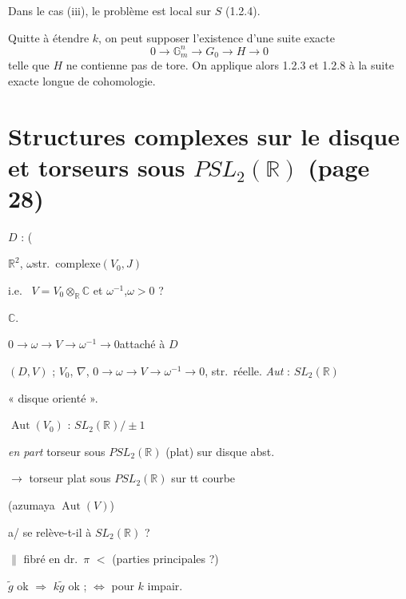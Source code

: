 \documentclass[11pt,a4paper]{article}
\begin{document}
Dans le cas (iii), le problème est local sur $S$ (1.2.4).

Quitte à étendre $k$, on peut supposer l'existence d'une suite exacte
\[
0 \to \mathbb{G}_m^n \to G_0 \to H \to 0
\]
telle que $H$ ne contienne pas de tore. On applique alors 1.2.3 et 1.2.8 à la
suite exacte longue de cohomologie.

\section*{Structures complexes sur le disque et torseurs sous $PSL_2(\mathbb{R})$ (page 28)}


$D$ : (\struck{\ill{}}

$\mathbb{R}^2$, $\omega$\quad str.\ complexe\quad $(V_0, J)$

i.e.\  $V = V_0 \otimes_{\mathbb{R}} \mathbb{C}$ et $\omega^{-1}$,\quad $\omega > 0$ ?

\emph{}\quad $\mathbb{C}$.

$0 \to \omega \to V \to \omega^{-1} \to 0$\quad attaché à $D$

$(D, V)$ ; $V_0$, $\nabla$, $0 \to \omega \to V \to \omega^{-1} \to 0$, str.\ réelle. \emph{Aut} : $SL_2(\mathbb{R})$

« disque orienté ».

$\operatorname{Aut}(V_0)$ : $SL_2(\mathbb{R})/\pm 1$

\emph{en part} \quad torseur sous $PSL_2(\mathbb{R})$ (plat) sur disque abst.

$\to$ torseur plat sous $PSL_2(\mathbb{R})$ sur tt courbe

(azumaya \emph{$\operatorname{Aut}(V)$})

a/ se relève-t-il à $SL_2(\mathbb{R})$ ?

$\|$ fibré en dr.\ $\pi$ \quad $<$ (parties principales ?)


$\tilde{g}$ ok $\Rightarrow$ $k \tilde{g}$ ok ; $\Leftrightarrow$ pour $k$ impair.
\end{document}

